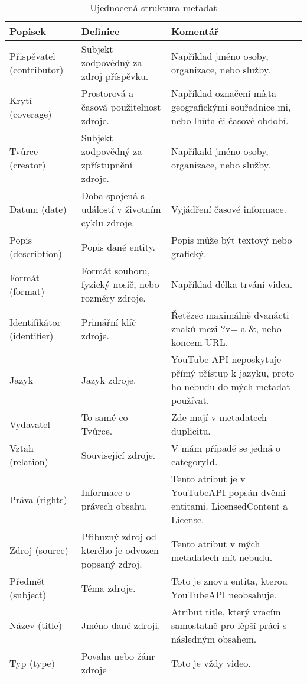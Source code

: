 \begin{table}[h!]
\caption[DublinCore metadata]{Ujednocená struktura metadat}\label{tab:dublincore1}
\begin{tabular}{|p{} | p{} | p{}|}
\hline
Popisek & Definice & Komentář\\
\hline
Přispěvatel (contributor) & Subjekt zodpovědný za zdroj příspěvku. & Například jméno osoby, organizace, nebo služby.\\
\hline
Krytí (coverage) & Prostorová a časová použitelnost zdroje. & Například označení místa geografickými souřadnice mi, nebo lhůta či časové období.\\
\hline
Tvůrce (creator) & Subjekt zodpovědný za zpřístupnění zdroje. & Napříkald jméno osoby, organizace, nebo služby.\\
\hline
Datum (date) & Doba spojená s událostí v životním cyklu zdroje. & Vyjádření časové informace. \\
\hline
Popis (describtion) & Popis dané entity. & Popis může být textový nebo grafický. \\
\hline
Formát (format) & Formát souboru, fyzický nosič, nebo rozměry zdroje. & Například délka trvání videa. \\
\hline
Identifikátor (identifier) & Primářní klíč zdroje. & Řetězec maximálně dvanácti znaků mezi ?v= a \&, nebo koncem URL.\\
\hline
Jazyk & Jazyk zdroje. & YouTube API neposkytuje přímý přístup k jazyku, proto ho nebudu do mých metadat používat.\\
\hline
Vydavatel & To samé co Tvůrce. & Zde mají v metadatech duplicitu. \\
\hline
Vztah (relation) & Související zdroje. & V mám případě se jedná o categoryId. \\
\hline
Práva (rights) & Informace o právech obsahu. & Tento atribut je v YouTubeAPI popsán dvěmi entitami. LicensedContent a License.\\
\hline
Zdroj (source) & Přibuzný zdroj od kterého je odvozen popsaný zdroj. & Tento atribut v mých metadatech mít nebudu.\\
\hline
Předmět (subject) & Téma zdroje. & Toto je znovu entita, kterou YouTubeAPI neobsahuje.\\
\hline
Název (title) & Jméno dané zdroji. & Atribut title, který vracím samostatně pro lěpší práci s následným obsahem.\\
\hline
Typ (type) & Povaha nebo žánr zdroje & Toto je vždy video.\\
\hline
\end{tabular}
\end{table}
\vfill